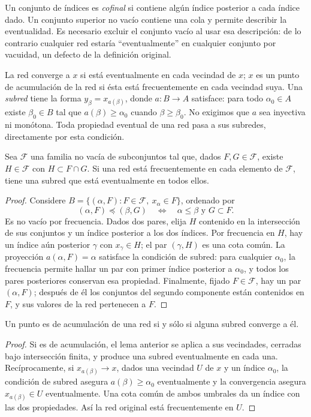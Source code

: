 Un conjunto de índices es \emph{cofinal} si contiene algún índice posterior a cada índice dado. Un conjunto superior no vacío contiene una cola y permite describir la eventualidad. Es necesario excluir el conjunto vacío al usar esa descripción: de lo contrario cualquier red estaría ``eventualmente'' en cualquier conjunto por vacuidad, un defecto de la definición original.

La red converge a $x$ si está eventualmente en cada vecindad de $x$; $x$ es un punto de acumulación de la red si ésta está frecuentemente en cada vecindad suya. Una \emph{subred} tiene la forma $y_\beta=x_{a(\beta)}$, donde $a:B\to A$ satisface: para todo $\alpha_0\in A$ existe $\beta_0\in B$ tal que $a(\beta)\ge\alpha_0$ cuando $\beta\ge\beta_0$. No exigimos que $a$ sea inyectiva ni monótona. Toda propiedad eventual de una red pasa a sus subredes, directamente por esta condición.

\begin{lema}\label{v3:subred-familia}
Sea $\mathcal F$ una familia no vacía de subconjuntos tal que, dados $F,G\in\mathcal F$, existe $H\in\mathcal F$ con $H\subset F\cap G$. Si una red está frecuentemente en cada elemento de $\mathcal F$, tiene una subred que está eventualmente en todos ellos.
\end{lema}
\begin{proof}
Considere $B=\{(\alpha,F):F\in\mathcal F,\ x_\alpha\in F\}$, ordenado por
\[(\alpha,F)\preceq(\beta,G)\quad\Longleftrightarrow\quad
\alpha\le\beta\text{ y }G\subset F.
\]
Es no vacío por frecuencia. Dados dos pares, elija $H$ contenido en la intersección de sus conjuntos y un índice posterior a los dos índices. Por frecuencia en $H$, hay un índice aún posterior $\gamma$ con $x_\gamma\in H$; el par $(\gamma,H)$ es una cota común. La proyección $a(\alpha,F)=\alpha$ satisface la condición de subred: para cualquier $\alpha_0$, la frecuencia permite hallar un par con primer índice posterior a $\alpha_0$, y todos los pares posteriores conservan esa propiedad. Finalmente, fijado $F\in\mathcal F$, hay un par $(\alpha,F)$; después de él los conjuntos del segundo componente están contenidos en $F$, y sus valores de la red pertenecen a $F$.
\end{proof}

\begin{proposicion}\label{v3:acumulacion-subred}
Un punto es de acumulación de una red si y sólo si alguna subred converge a él.
\end{proposicion}
\begin{proof}
Si es de acumulación, el lema anterior se aplica a sus vecindades, cerradas bajo intersección finita, y produce una subred eventualmente en cada una. Recíprocamente, si $x_{a(\beta)}\to x$, dados una vecindad $U$ de $x$ y un índice $\alpha_0$, la condición de subred asegura $a(\beta)\ge\alpha_0$ eventualmente y la convergencia asegura $x_{a(\beta)}\in U$ eventualmente. Una cota común de ambos umbrales da un índice con las dos propiedades. Así la red original está frecuentemente en $U$.
\end{proof}

